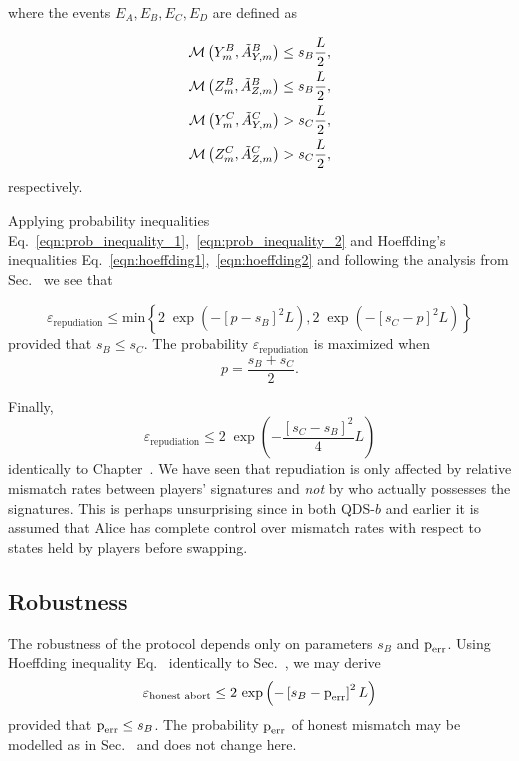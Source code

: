 \noindent where the events $E_A, E_B, E_C, E_D$ are defined as

\begin{align}
\mathcal{M}\left(Y_m^B, \tilde{A}_{Y, m}^B\right) \le s_B \frac{L}{2}, \notag \\
%
\mathcal{M}\left(Z_m^B, \tilde{A}_{Z, m}^B\right) \le s_B \frac{L}{2}, \notag \\
%
\mathcal{M}\left(Y_m^C, \tilde{A}_{Y, m}^C\right) > s_C \frac{L}{2}, \notag \\
%
\mathcal{M}\left(Z_m^C, \tilde{A}_{Z, m}^C\right) > s_C \frac{L}{2},
\end{align}
respectively.

Applying probability inequalities Eq.~\ref{eqn:prob_inequality_1},~\ref{eqn:prob_inequality_2} and Hoeffding's inequalities Eq.~\ref{eqn:hoeffding1},~\ref{eqn:hoeffding2} and following the analysis from Sec.~ we see that

\begin{equation}
\varepsilon_{\text{repudiation}} \le \text{min}\left\{ 2 \; \exp\left(-\left[ p - s_B\right]^2 L\right), 2 \; \exp\left( - \left[ s_C - p\right]^2 L\right) \right\}
\end{equation}
\noindent 
provided that $s_B \le s_C$. The probability $\varepsilon_{\text{repudiation}}$ is maximized when
\begin{equation}
p = \frac{s_B + s_C}{2}.
\end{equation}

\noindent Finally,
\begin{equation}\label{eqn:aqc_repudiation}
\varepsilon_{\text{repudiation}} \le 2 \; \exp\left( - \frac{\left[s_C - s_B\right]^2}{4}L\right)
\end{equation}
identically to Chapter~. We have seen that repudiation is only affected by relative mismatch rates between players' signatures and \emph{not} by who actually possesses the signatures. This is perhaps unsurprising since in both QDS-$b$ and earlier it is assumed that Alice has complete control over mismatch rates with respect to states held by players before swapping.

\subsection{Robustness}
The robustness of the protocol depends only on parameters $s_B$ and $\text{p}_{\text{err}}$. Using Hoeffding inequality Eq.~ identically to Sec.~, we may derive 
\begin{equation}\label{eqn:aqc_robustness}
\varepsilon_{\text{honest abort}} \le 2 \, \exp\left( - \left[s_B - \text{p}_{\text{err}}\right]^2 L\right)
\end{equation}
provided that $\text{p}_{\text{err}} \le s_B$. The probability $\text{p}_{\text{err}}$ of honest mismatch may be modelled as in Sec.~ and does not change here.

